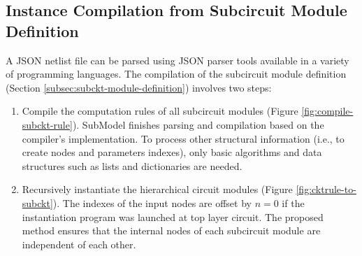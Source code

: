 \subsection{Instance Compilation from Subcircuit Module Definition}
\label{subsec:subckt-module-compilation}
A JSON netlist file can be parsed using JSON parser tools available in a variety of programming languages. The compilation of the subcircuit module definition (Section \ref{subsec:subckt-module-definition}) involves two steps:
\begin{enumerate}[partopsep=0pt,topsep=0pt,itemsep=0pt,parsep=0pt]
  \item Compile the computation rules of all subcircuit modules (Figure \ref{fig:compile-subckt-rule}). SubModel finishes parsing and compilation based on the compiler's implementation. To process other structural information (i.e., to create nodes and parameters indexes), only basic algorithms and data structures such as lists and dictionaries are needed.
\item Recursively instantiate the hierarchical circuit modules (Figure \ref{fig:cktrule-to-subckt}).
  The indexes of the input nodes are offset by $n=0$ if the instantiation program was launched at top layer circuit. The proposed method ensures that the internal nodes of each subcircuit module are independent of each other.
\end{enumerate}

